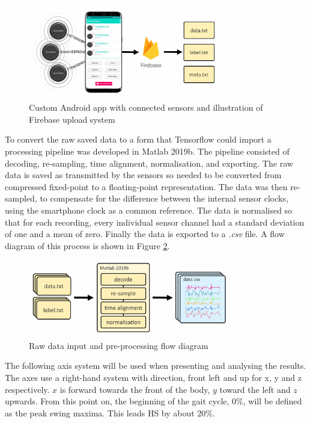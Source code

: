 \documentclass[sensors,article,submit,moreauthors,pdftex]{Definitions/mdpi}
\begin{document}
\begin{figure}[!hbt]
    \centering
    \includegraphics[width=0.8\textwidth]{Figures/movesense/sensor_collection.jpg}
    \caption{Custom Android app with connected sensors and illustration of Firebase upload system}
    \label{subfig:data_collection}
    \label{fig:data_collection_diagrams}
\end{figure}

To convert the raw saved data to a form that Tensorflow could import a processing pipeline was developed in Matlab 2019b. The pipeline consisted of decoding, re-sampling, time alignment, normalisation, and exporting. The raw data is saved as transmitted by the sensors so needed to be converted from compressed fixed-point to a floating-point representation. The data was then re-sampled, to compensate for the difference between the internal sensor clocks, using the smartphone clock as a common reference. The data is normalised so that for each recording, every individual sensor channel had a standard deviation of one and a mean of zero. Finally the data is exported to a \textit{.csv} file. A flow diagram of this process is shown in Figure \ref{fig:data_processing}.

\begin{figure}[!hbt]
    \centering
    \includegraphics[width=0.8\textwidth]{Figures/movesense/data_processing.jpg}
    \caption{Raw data input and pre-processing flow diagram}
    \label{fig:data_processing}
\end{figure}

The following axis system will be used when presenting and analysing the results. The axes use a right-hand system with direction, front left and up for x, y and z respectively. $x$ is forward towards the front of the body, $y$ toward the left and $z$ upwards. From this point on, the beginning of the gait cycle, 0\%, will be defined as the peak swing maxima. This leads HS by about 20\%.
\end{document}

